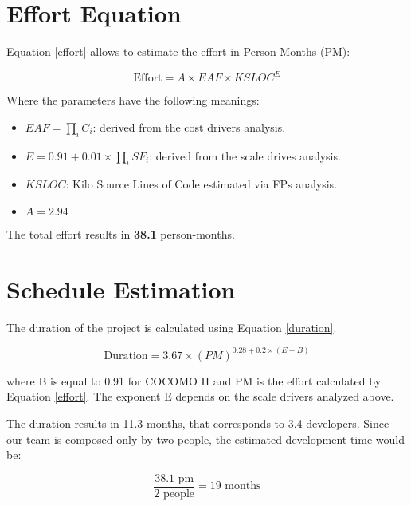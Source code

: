 \section{Effort Equation}
Equation \ref{effort} allows to estimate the effort in Person-Months (PM):

\begin{equation}
    \textrm{Effort} = A \times EAF \times KSLOC^E
    \label{effort}
\end{equation}

Where the parameters have the following meanings:
\begin{itemize}
    \item $EAF = \prod_i C_i$: derived from the cost drivers analysis.
    \item $E=0.91 + 0.01 \times \prod_{i}SF_i$: derived from the scale drives analysis.
    \item $KSLOC$: Kilo Source Lines of Code estimated via FPs analysis.
    \item $A=2.94$
\end{itemize}

The total effort results in \textbf{38.1} person-months.


\section{Schedule Estimation}
The duration of the project is calculated using Equation \ref{duration}.

\begin{equation}
    \textrm{Duration} = 3.67 \times (PM)^{0.28+0.2 \times (E-B)}
    \label{duration}
\end{equation}

\noindent
where B is equal to 0.91 for COCOMO II and PM is the effort calculated by Equation \ref{effort}. The exponent E depends on the scale drivers analyzed above.


The duration results in 11.3 months, that corresponds to 3.4 developers. Since our team is composed only by two people, the estimated development time would be:

\[\frac{38.1\textrm{ pm}}{2 \textrm{ people}}=19\textrm{ months}\]